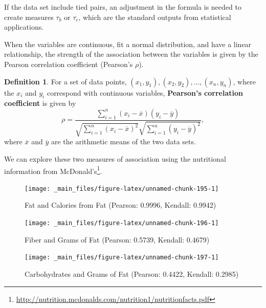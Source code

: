 \documentclass[
]{book}
\theoremstyle{definition}
\newtheorem{definition}{Definition}[chapter]
\theoremstyle{definition}
\theoremstyle{definition}
\theoremstyle{definition}
\theoremstyle{remark}
\begin{document}
If the data set include tied pairs, an adjustment in the formula is needed to create measures \(\tau_b\) or \(\tau_c\), which are the standard outputs from statistical applications.

When the variables are continuous, fit a normal distribution, and have a linear relationship, the strength of the association between the variables is given by the Pearson correlation coefficient (Pearson's \(\rho\)).

\begin{definition}
For a set of data points, \((x_1, y_1), (x_2, y_2), \ldots, (x_n,y_n)\), where the \(x_i\) and \(y_i\) correspond with continuous variables, \textbf{Pearson's correlation coefficient} is given by
\[\rho = \frac{ \sum_{i=1}^n (x_i-\overline{x})(y_i-\overline{y})}{\sqrt{\sum_{i=1}^n (x_i-\overline{x})^2} \sqrt{\sum_{i=1}^n (y_i-\overline{y})^2}},\] where \(\overline{x}\) and \(\overline{y}\) are the arithmetic means of the two data sets.
\end{definition}

We can explore these two measures of association using the nutritional information from McDonald's\footnote{\url{http://nutrition.mcdonalds.com/nutrition1/nutritionfacts.pdf}}.

\begin{figure}

{\centering \texttt{[image: \_main\_files/figure-latex/unnamed-chunk-195-1]} 

}

\caption{Fat and Calories from Fat (Pearson: 0.9996, Kendall: 0.9942)}\label{fig:unnamed-chunk-195}
\end{figure}

\begin{figure}

{\centering \texttt{[image: \_main\_files/figure-latex/unnamed-chunk-196-1]} 

}

\caption{Fiber and Grams of Fat (Pearson: 0.5739, Kendall: 0.4679)}\label{fig:unnamed-chunk-196}
\end{figure}

\begin{figure}

{\centering \texttt{[image: \_main\_files/figure-latex/unnamed-chunk-197-1]} 

}

\caption{Carbohydrates and Grams of Fat (Pearson: 0.4422, Kendall: 0.2985)}\label{fig:unnamed-chunk-197}
\end{figure}
\end{document}

